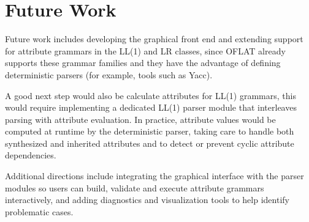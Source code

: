 \section{Future Work}

Future work includes developing the graphical front end and extending support for attribute grammars in the LL(1) and LR classes, 
since OFLAT already supports these grammar families and they have the advantage of defining deterministic parsers (for example, tools such as Yacc).  

A good next step would also be calculate attributes for LL(1) grammars, this would 
require implementing a dedicated LL(1) parser module that interleaves parsing with attribute evaluation. In practice, attribute values would be computed at 
runtime by the deterministic parser, taking care to handle both synthesized and inherited attributes and to detect or prevent cyclic attribute dependencies.  

Additional directions include integrating the graphical interface with the parser modules so users can build, validate and execute attribute grammars 
interactively, and adding diagnostics and visualization tools to help identify problematic cases.
